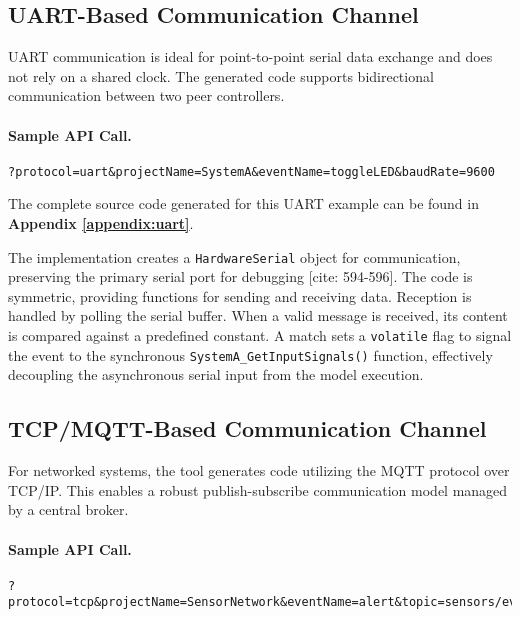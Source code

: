 \subsection{UART-Based Communication Channel}
\label{subsec:uart_analysis}
UART communication is ideal for point-to-point serial data exchange and does not rely on a shared clock. The generated code supports bidirectional communication between two peer controllers.

\paragraph{Sample API Call.}
\begin{verbatim}
?protocol=uart&projectName=SystemA&eventName=toggleLED&baudRate=9600
\end{verbatim}

The complete source code generated for this UART example can be found in \textbf{Appendix \ref{appendix:uart}}.

The implementation creates a \texttt{HardwareSerial} object for communication, preserving the primary serial port for debugging [cite: 594-596]. The code is symmetric, providing functions for sending and receiving data. Reception is handled by polling the serial buffer. When a valid message is received, its content is compared against a predefined constant. A match sets a \texttt{volatile} flag to signal the event to the synchronous \texttt{SystemA\_GetInputSignals()} function, effectively decoupling the asynchronous serial input from the model execution.

\subsection{TCP/MQTT-Based Communication Channel}
\label{subsec:tcp_analysis}
For networked systems, the tool generates code utilizing the MQTT protocol over TCP/IP. This enables a robust publish-subscribe communication model managed by a central broker.

\paragraph{Sample API Call.}
\begin{verbatim}
?protocol=tcp&projectName=SensorNetwork&eventName=alert&topic=sensors/events
\end{verbatim}

